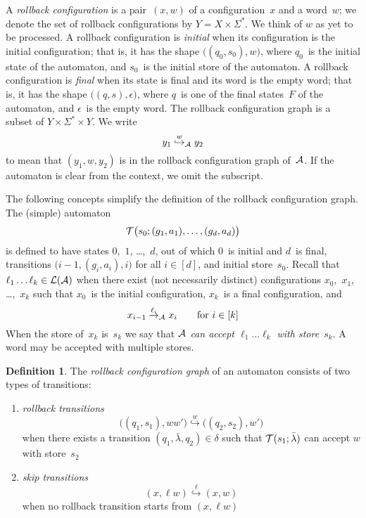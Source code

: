 \documentclass{article} %
\theoremstyle{definition}
\newtheorem{definition}{Definition}
\theoremstyle{remark}
\begin{document}
A \emph{rollback configuration} is a pair~$(x,w)$ of a configuration~$x$ and a word~$w$;
we denote the set of rollback configurations by $Y=X\times\Sigma^*$.
We think of $w$ as yet to be processed.
A rollback configuration is \emph{initial} when its configuration is the initial configuration; that is, it has the shape $\bigl((q_0,s_0),w\bigr)$, where $q_0$~is the initial state of the automaton, and $s_0$~is the initial store of the automaton.
A rollback configuration is \emph{final} when its state is final and its word is the empty word; that is, it has the shape $\bigl((q,s),\epsilon\bigr)$, where $q$~is one of the final states~$F$ of the automaton, and $\epsilon$~is the empty word.
The rollback configuration graph is a subset of $Y\times\Sigma^*\times Y$.
We write \[ y_1 \stackrel w\hookrightarrow_{\cal A} y_2\] to mean that $(y_1,w,y_2)$ is in the rollback configuration graph of~${\cal A}$.
If the automaton is clear from the context, we omit the subscript.

The following concepts simplify the definition of the rollback configuration graph.
The (simple) automaton \[{\cal T}\bigl(s_0;(g_1,a_1),\ldots,(g_d,a_d)\bigr)\] is defined to have states $0$,~$1$, \dots,~$d$, out of which $0$~is initial and $d$~is final, transitions $\bigl(i-1,(g_i,a_i),i\bigr)$ for all $i\in[d]$, and initial store~$s_0$.
Recall that $\ell_1\ldots\ell_k\in{\cal L}({\cal A})$ when there exist (not necessarily distinct) configurations $x_0$,~$x_1$, \dots,~$x_k$ such that $x_0$~is the initial configuration, $x_k$~is a final configuration, and \[x_{i-1}\stackrel{\ell_i}\to_{\cal A}x_i\qquad\text{for $i\in[k]$}\]
When the store of~$x_k$ is~$s_k$ we say that \emph{${\cal A}$ can accept $\ell_1\ldots\ell_k$ with store~$s_k$}.
A word may be accepted with multiple stores.

\begin{definition}\label{def:rcg}
The \emph{rollback configuration graph} of an automaton consists of two types of transitions:
\begin{enumerate}
\item \emph{rollback transitions}
  \[\bigl((q_1,s_1),ww'\bigr)\stackrel w\hookrightarrow\bigl((q_2,s_2),w'\bigr)\]
when there exists a transition $(q_1,\bar\lambda,q_2)\in\delta$ such that ${\cal T}(s_1;\bar\lambda)$ can accept $w$ with store~$s_2$
\item \emph{skip transitions}
  \[(x,\ell w)\stackrel\ell\hookrightarrow(x,w)\]
when no rollback transition starts from $(x,\ell w)$
\end{enumerate}
\end{definition}
\end{document}
